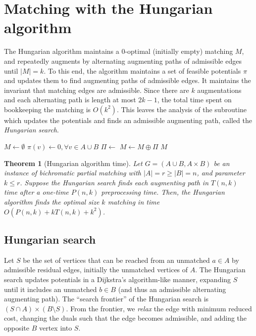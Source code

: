\documentclass[11pt]{article}
\theoremstyle{plain}
\newtheorem{theorem}{Theorem}
\begin{document}
\section{Matching with the Hungarian algorithm}
\label{section:hung}

The Hungarian algorithm maintains a 0-optimal (initially empty) matching $M$, 
and repeatedly augments by alternating augmenting paths of admissible edges 
until $|M| = k$.
To this end, the algorithm maintains a set of feasible potentials $\pi$ and 
updates them to find augmenting paths of admissible edges.
It maintains the invariant that matching edges are admissible.
Since there are $k$ augmentations and each alternating path is length at most 
$2k-1$, the total time spent on bookkeeping the matching is $O(k^2)$.
This leaves the analysis of the subroutine which updates the potentials and 
finds an admissible augmenting path, called the \emph{Hungarian search}.

\begin{algorithm}
\caption{Hungarian Algorithm}
\begin{algorithmic}[1]
	\State $M \gets \emptyset$
	\State $\pi(v) \gets 0, \forall v \in A \cup B$
		\State $\Pi \gets$ 
		\State $M \gets M \oplus \Pi$
	\EndWhile
	\State\Return $M$
\EndFunction
\end{algorithmic}
\end{algorithm}

\begin{theorem}[Hungarian algorithm time]
\label{theorem:hung_orig}
	Let $G = (A \cup B, A \times B)$ be an instance of bichromatic partial 
	matching with $|A| = r \geq |B| = n$, and parameter $k \leq r$.
	Suppose the Hungarian search finds each augmenting path in $T(n, k)$ 
	time after a one-time $P(n, k)$ preprocessing time.
	Then, the Hungarian algorithm finds the optimal size $k$ matching in
	time $O(P(n, k) + k T(n, k) + k^2)$.
\end{theorem}

\subsection{Hungarian search}

Let $S$ be the set of vertices that can be reached from an unmatched $a \in A$ 
by admissible residual edges, initially the unmatched vertices of $A$.
The Hungarian search updates potentials in a Dijkstra's algorithm-like manner, 
expanding $S$ until it includes an unmatched $b \in B$ (and thus an admissible 
alternating augmenting path).
The ``search frontier'' of the Hungarian search is 
$(S \cap A) \times (B \setminus S)$.
From the frontier, we \emph{relax} the edge with minimum reduced cost, changing 
the duals such that the edge becomes admissible, and adding the opposite $B$ 
vertex into $S$.
\end{document}
